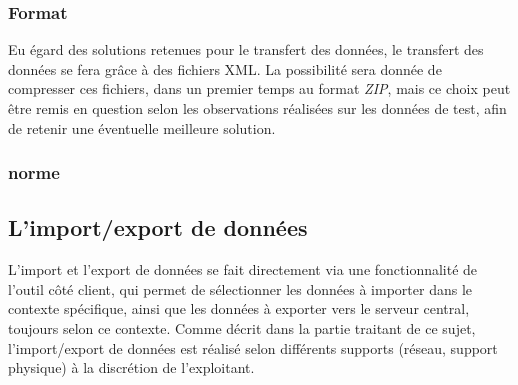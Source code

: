 \subsubsection{Format}
Eu égard des solutions retenues pour le transfert des données, le transfert des données se fera grâce à des fichiers XML.
La possibilité sera donnée de compresser ces fichiers, dans un premier temps au format \emph{ZIP}, mais ce choix peut être remis en question selon les observations réalisées sur les données de test, afin de retenir une éventuelle meilleure solution.

\subsubsection{norme}
% 
% 

\subsection{L'import/export de données}
L'import et l'export de données se fait directement via une fonctionnalité de l'outil côté client, qui permet de sélectionner les données à importer dans le contexte spécifique, ainsi que les données à exporter vers le serveur central, toujours selon ce contexte.
Comme décrit dans la partie traitant de ce sujet, l'import/export de données est réalisé selon différents supports (réseau, support physique) à la discrétion de l'exploitant.
